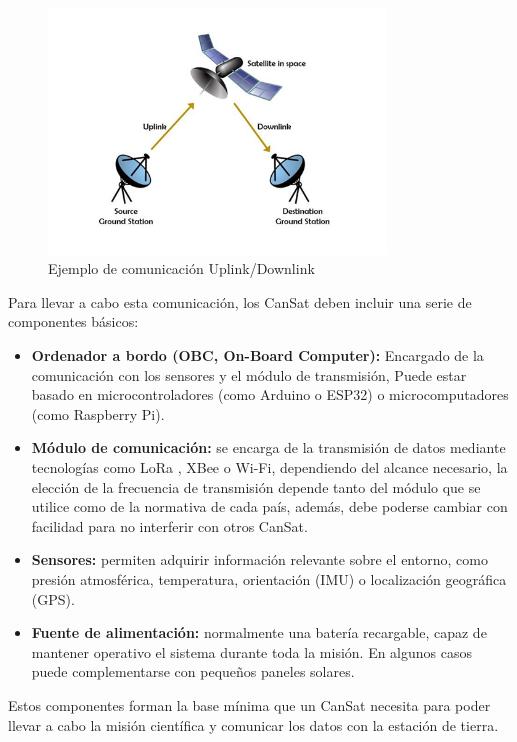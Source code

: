 \begin{figure}
    \centering
    \includegraphics[width=0.8\textwidth]{Imagenes/Bitmap/upling_downlink}
    \caption{Ejemplo de comunicación Uplink/Downlink}
    \label{fig:uplink_downlink}
\end{figure}

Para llevar a cabo esta comunicación, los CanSat deben incluir una serie de componentes básicos:
\begin{itemize}
    \item \textbf{Ordenador a bordo (OBC, On-Board Computer):} Encargado de la comunicación con los sensores y el módulo de transmisión, Puede estar basado en microcontroladores (como Arduino o ESP32) o microcomputadores (como Raspberry Pi).
    \item \textbf{Módulo de comunicación:} se encarga de la transmisión de datos mediante tecnologías como LoRa \cite{lora2015overview}, XBee \cite{xbee} o Wi-Fi, dependiendo del alcance necesario,
    la elección de la frecuencia de transmisión depende tanto del módulo que se utilice como de la normativa de cada país, además, debe poderse cambiar con facilidad para no interferir con otros CanSat.
    \item \textbf{Sensores:} permiten adquirir información relevante sobre el entorno, como presión atmosférica, temperatura, orientación (IMU) o localización geográfica (GPS).
    \item \textbf{Fuente de alimentación:} normalmente una batería recargable, capaz de mantener operativo el sistema durante toda la misión. En algunos casos puede complementarse con pequeños paneles solares.
\end{itemize}

Estos componentes forman la base mínima que un CanSat necesita para poder llevar a cabo la misión científica y comunicar los datos con la estación de tierra.


